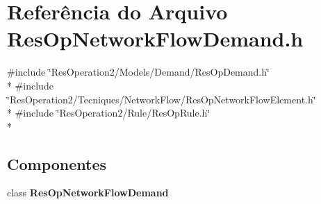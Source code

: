 \section{Referência do Arquivo Res\+Op\+Network\+Flow\+Demand.\+h}
\label{_res_op_network_flow_demand_8h}
{\ttfamily \#include \char`\"{}Res\+Operation2/\+Models/\+Demand/\+Res\+Op\+Demand.\+h\char`\"{}}\\*
{\ttfamily \#include \char`\"{}Res\+Operation2/\+Tecniques/\+Network\+Flow/\+Res\+Op\+Network\+Flow\+Element.\+h\char`\"{}}\\*
{\ttfamily \#include \char`\"{}Res\+Operation2/\+Rule/\+Res\+Op\+Rule.\+h\char`\"{}}\\*
\subsection*{Componentes}
\begin{DoxyCompactItemize}
\item 
class {\bf Res\+Op\+Network\+Flow\+Demand}
\end{DoxyCompactItemize}
